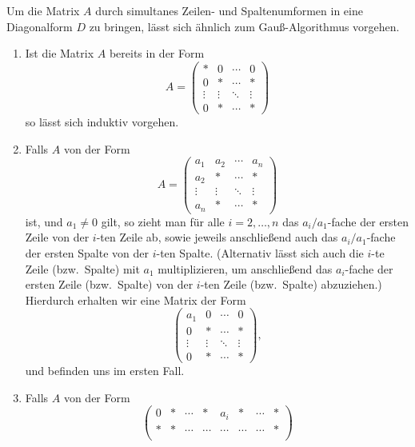 Um die Matrix $A$ durch simultanes Zeilen- und Spaltenumformen in eine Diagonalform $D$ zu bringen, lässt sich ähnlich zum Gauß-Algorithmus vorgehen.
\begin{enumerate}
  \item 
    Ist die Matrix $A$ bereits in der Form
    \[
        A
      = \begin{pmatrix}
          *       & 0       & \cdots  & 0       \\
          0       & *       & \cdots  & *       \\
          \vdots  & \vdots  & \ddots  & \vdots  \\
          0       & *       & \cdots  & *
        \end{pmatrix}
    \]
    so lässt sich induktiv vorgehen.
  \item
    Falls $A$ von der Form
    \[
        A
      = \begin{pmatrix}
          a_1     & a_2     & \cdots  & a_n     \\
          a_2     & *       & \cdots  & *       \\
          \vdots  & \vdots  & \ddots  & \vdots  \\
          a_n     & *       & \cdots  & *
        \end{pmatrix}
    \]
    ist, und $a_1 \neq 0$ gilt, so zieht man für alle $i = 2, \dotsc, n$ das $a_i/a_1$-fache der ersten Zeile von der $i$-ten Zeile ab, sowie jeweils anschließend auch das $a_i/a_1$-fache der ersten Spalte von der $i$-ten Spalte.
    (Alternativ lässt sich auch die $i$-te Zeile (bzw.\ Spalte) mit $a_1$ multiplizieren, um anschließend das $a_i$-fache der ersten Zeile (bzw.\ Spalte) von der $i$-ten Zeile (bzw.\ Spalte) abzuziehen.)
    Hierdurch erhalten wir eine Matrix der Form
    \[
      \begin{pmatrix}
        a_1     & 0       & \cdots  & 0       \\
        0       & *       & \cdots  & *       \\
        \vdots  & \vdots  & \ddots  & \vdots  \\
        0       & *       & \cdots  & *
      \end{pmatrix},
    \]
    und befinden uns im ersten Fall.
  \item
    Falls $A$ von der Form
    \[
      \begin{pmatrix}
        0       & *       & \cdots  & *       & a_i     & *       & \cdots  & *       \\
        *       & *       & \cdots  & \cdots  & \cdots  & \cdots  & \cdots  & *       \\

\end{pmatrix}\]
\end{enumerate}
